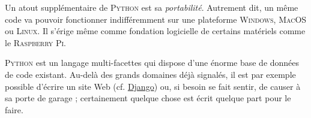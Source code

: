 %
Un atout supplémentaire de \textsc{Python} est sa \textit{portabilité}. Autrement dit, un même code va pouvoir fonctionner indifféremment sur une plateforme \textsc{Windows}, \textsc{MacOS} ou \textsc{Linux}. Il s'érige même comme fondation logicielle de certains matériels comme le \textsc{Raspberry Pi}.

\textsc{Python} est un langage multi-facettes qui dispose d'une énorme base de données de code%
 existant. Au-delà des grands domaines déjà signalés, il est par exemple possible d'écrire un site Web (cf. \href{https://www.djangoproject.com/}{Django}) ou, si besoin se fait sentir, de causer à sa porte de garage ; certainement quelque chose est écrit quelque part pour le faire.

